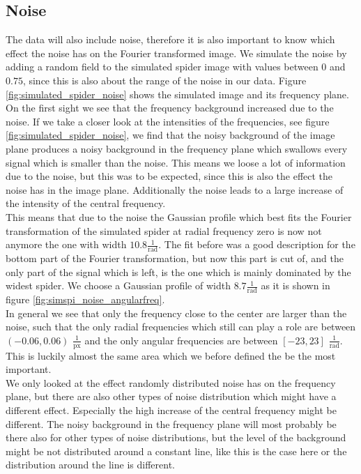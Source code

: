\subsection{Noise}
\label{sec:noise}
The data will also include noise, therefore it is also important to know which effect the noise has on the Fourier transformed image. We simulate the noise by adding a random field to the simulated spider image with values between $0$ and $0.75$, since this is also about the range of the noise in our data. Figure \ref{fig:simulated_spider_noise} shows the simulated image and its frequency plane. On the first sight we see that the frequency background increased due to the noise. If we take a closer look at the intensities of the frequencies, see figure \ref{fig:simulated_spider_noise}, we find that the noisy background of the image plane produces a noisy background in the frequency plane which swallows every signal which is smaller than the noise. This means we loose a lot of information due to the noise, but this was to be expected, since this is also the effect the noise has in the image plane. Additionally the noise leads to a large increase of the intensity of the central frequency.\\
This means that due to the noise the Gaussian profile which best fits the Fourier transformation of the simulated spider at radial frequency zero is now not anymore the one with width $10.8 \frac{1}{\mathrm{rad}}$. The fit before was a good description for the bottom part of the Fourier transformation, but now this part is cut of, and the only part of the signal which is left, is the one which is mainly dominated by the widest spider. We choose a Gaussian profile of width $8.7 \frac{1}{\mathrm{rad}}$ as it is shown in figure \ref{fig:simspi_noise_angularfreq}.\\
In general we see that only the frequency close to the center are larger than the noise, such that the only radial frequencies which still can play a role are between $(-0.06, 0.06)$ $\frac{1}{\mathrm{px}}$ and the only angular frequencies are between $[-23, 23]$ $\frac{1}{\mathrm{rad}}$. This is luckily almost the same area which we before defined the be the most important. \\
We only looked at the effect randomly distributed noise has on the frequency plane, but there are also other types of noise distribution which might have a different effect. Especially the high increase of the central frequency might be different. The noisy background in the frequency plane will most probably be there also for other types of noise distributions, but the level of the background might be not distributed around a constant line, like this is the case here or the distribution around the line is different. 
